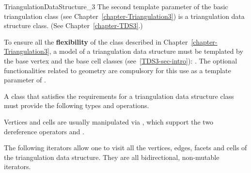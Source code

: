 \begin{ccRefConcept}{TriangulationDataStructure_3}
The second template parameter of the basic triangulation class 
(see Chapter~\ref{chapter-Triangulation3})
 is a triangulation 
data structure class. (See Chapter~\ref{chapter-TDS3}.)  

To ensure all the \textbf{flexibility} of the class 
described in 
 Chapter~\ref{chapter-Triangulation3}, a model of a
triangulation data structure must be templated by the base vertex and
the base cell classes (see~\ref{TDS3-sec-intro}):
.
The optional functionalities related to geometry are compulsory for
this use as a template parameter of .

\bigskip

A class that satisfies the requirements for a triangulation data structure
class must provide the following types and operations. 

\ccTypes
{}
\ccThreeToTwo

\ccGlue
{}

\ccGlue
{} 

Vertices and cells are usually manipulated via , which support
the two dereference operators  and .

\ccGlue
{}

The following iterators allow one to visit all the vertices, edges, facets
and cells of the triangulation data structure. They are all
bidirectional, non-mutable iterators.

\ccGlue
{}
\ccGlue
{}
\ccGlue
{}


\end{ccRefConcept}
